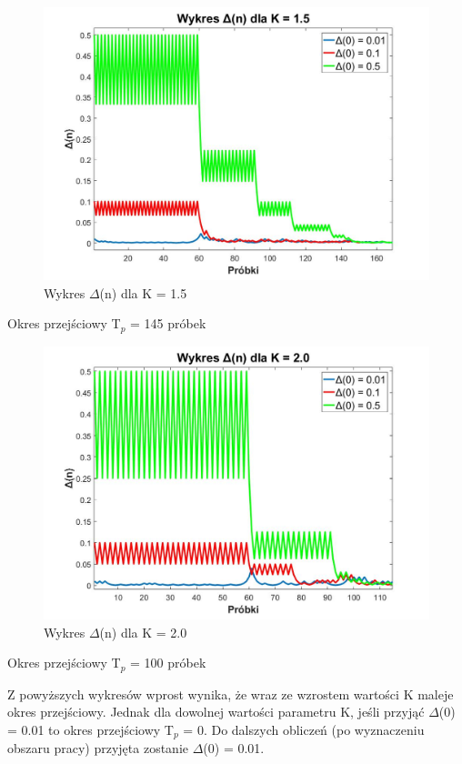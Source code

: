 \documentclass[12pt, a4paper, oneside]{article}
\begin{document}
\clearpage
\begin{figure}[h]
\centering
\caption{Wykres $\Delta$(n) dla K = 1.5}
\includegraphics[scale=0.33]{f3.jpg}
\end{figure}
\begin{center}
Okres przejściowy T$_p$ = 145 próbek
\end{center}
\begin{figure}[h]
\centering
\caption{Wykres $\Delta$(n) dla K = 2.0}
\includegraphics[scale=0.33]{f4.jpg}
\end{figure}
\begin{center}
Okres przejściowy T$_p$ = 100 próbek
\end{center}
\indent\indent Z powyższych wykresów wprost wynika, że wraz ze wzrostem wartości K maleje okres przejściowy. Jednak dla dowolnej wartości parametru K, jeśli przyjąć $\Delta$(0) = 0.01  to okres przejściowy T$_p$ = 0. Do dalszych obliczeń (po wyznaczeniu obszaru pracy) przyjęta zostanie $\Delta$(0) = 0.01.
\clearpage
\end{document}
